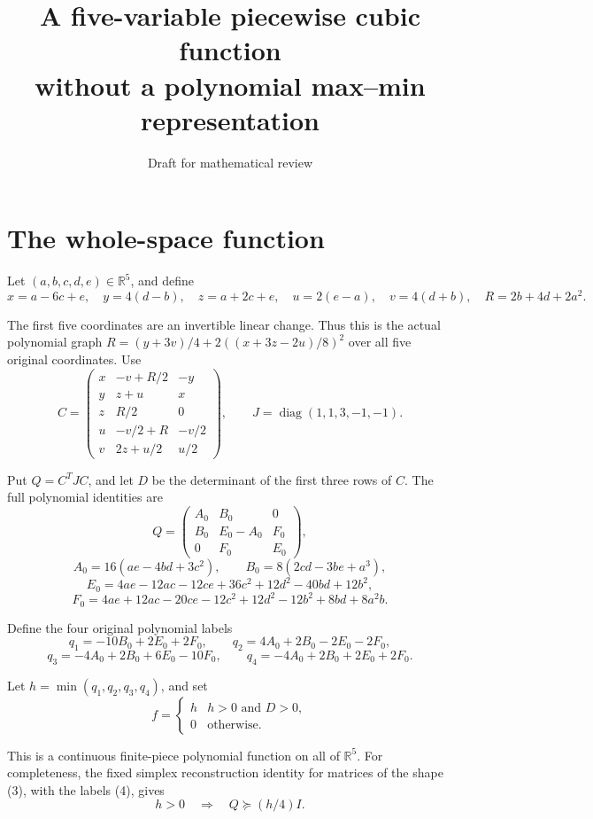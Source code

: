 \documentclass[11pt]{article}
\title{A five-variable piecewise cubic function\\
without a polynomial max--min representation}
\author{}
\date{\small Draft for mathematical review}
\begin{document}
\maketitle
\vspace{-1em}

\section{The whole-space function}

Let \((a,b,c,d,e)\in\mathbb R^5\), and define
\[
x=a-6c+e,\quad y=4(d-b),\quad z=a+2c+e,
\quad u=2(e-a),\quad v=4(d+b),\quad R=2b+4d+2a^2.
\tag{1}
\]

The first five coordinates are an invertible linear change. Thus this is
the actual polynomial graph
\(R=(y+3v)/4+2((x+3z-2u)/8)^2\) over all five original coordinates.
Use
\[
C=\begin{pmatrix}
x&-v+R/2&-y\\
y&z+u&x\\
z&R/2&0\\
u&-v/2+R&-v/2\\
v&2z+u/2&u/2
\end{pmatrix},\qquad J=\operatorname{diag}(1,1,3,-1,-1).
\tag{2}
\]

Put \(Q=C^TJC\), and let \(D\) be the determinant of the first three
rows of \(C\). The full polynomial identities are
\[
Q=\begin{pmatrix}A_0&B_0&0\\B_0&E_0-A_0&F_0\\0&F_0&E_0\end{pmatrix},
\]
\[
A_0=16(ae-4bd+3c^2),\qquad
B_0=8(2cd-3be+a^3),
\]
\[
E_0=4ae-12ac-12ce+36c^2+12d^2-40bd+12b^2,
\]
\[
F_0=4ae+12ac-20ce-12c^2+12d^2-12b^2+8bd+8a^2b.
\tag{3}
\]

Define the four original polynomial labels
\[
q_1=-10B_0+2E_0+2F_0,\qquad
q_2=4A_0+2B_0-2E_0-2F_0,
\]
\[
q_3=-4A_0+2B_0+6E_0-10F_0,\qquad
q_4=-4A_0+2B_0+2E_0+2F_0.
\tag{4}
\]

Let \(h=\min(q_1,q_2,q_3,q_4)\), and set
\[
f=\begin{cases}h& h>0\text{ and }D>0,\\0&\text{otherwise.}\end{cases}
\tag{5}
\]

This is a continuous finite-piece polynomial function on all of
\(\mathbb R^5\). For completeness, the fixed simplex reconstruction
identity for matrices of the shape (3), with the labels (4), gives
\[
h>0\quad\Longrightarrow\quad Q\succeq (h/4)I.
\tag{6}
\]
\end{document}
